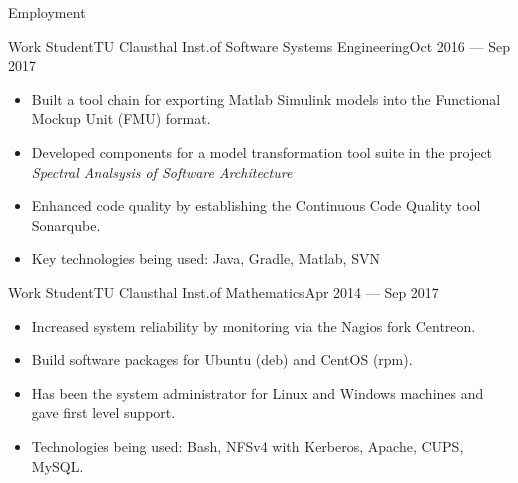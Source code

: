 \documentclass[]{mcdowellcv}
\begin{document}
\begin{cvsection}{Employment}
\begin{cvsubsection}{Work Student}{TU Clausthal Inst.\@ of Software Systems Engineering}{Oct 2016 --- Sep 2017}
\bigskip
\begin{itemize}
\item Built a tool chain for exporting Matlab Simulink models into the Functional Mockup Unit (FMU) format.
\item Developed components for a model transformation tool suite in the project \emph{Spectral Analsysis of Software Architecture}
\item Enhanced code quality by establishing the Continuous Code Quality tool Sonarqube.
\item Key technologies being used: Java, Gradle, Matlab, SVN
\end{itemize}
\end{cvsubsection}

\begin{cvsubsection}{Work Student}{TU Clausthal Inst.\@ of Mathematics}{Apr 2014 --- Sep 2017}
\bigskip
\begin{itemize}
\item Increased system reliability by monitoring via the Nagios fork Centreon.
\item Build software packages for Ubuntu (deb) and CentOS (rpm).
\item Has been the system administrator for Linux and Windows machines and gave first level support.
\item Technologies being used: Bash, NFSv4 with Kerberos, Apache, CUPS, MySQL\@.
\end{itemize}
\end{cvsubsection}

\end{cvsection}
\end{document}
